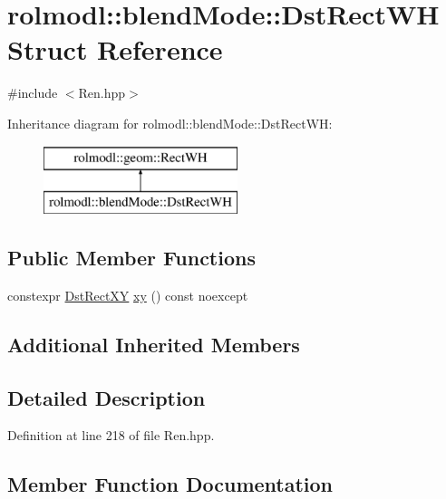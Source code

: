 \hypertarget{structrolmodl_1_1blend_mode_1_1_dst_rect_w_h}{}\section{rolmodl\+::blend\+Mode\+::Dst\+Rect\+WH Struct Reference}
\label{structrolmodl_1_1blend_mode_1_1_dst_rect_w_h}


{\ttfamily \#include $<$Ren.\+hpp$>$}

Inheritance diagram for rolmodl\+::blend\+Mode\+::Dst\+Rect\+WH\+:\begin{figure}[H]
\begin{center}
\leavevmode
\includegraphics[height=2.000000cm]{structrolmodl_1_1blend_mode_1_1_dst_rect_w_h}
\end{center}
\end{figure}
\subsection*{Public Member Functions}
\begin{DoxyCompactItemize}
\item 
constexpr \mbox{\hyperlink{structrolmodl_1_1blend_mode_1_1_dst_rect_x_y}{Dst\+Rect\+XY}} \mbox{\hyperlink{structrolmodl_1_1blend_mode_1_1_dst_rect_w_h_a4758ee14ccd1354039dc27e960ff9c36}{xy}} () const noexcept
\end{DoxyCompactItemize}
\subsection*{Additional Inherited Members}


\subsection{Detailed Description}


Definition at line 218 of file Ren.\+hpp.



\subsection{Member Function Documentation}
\mbox{\label{structrolmodl_1_1blend_mode_1_1_dst_rect_w_h_a4758ee14ccd1354039dc27e960ff9c36}} 
